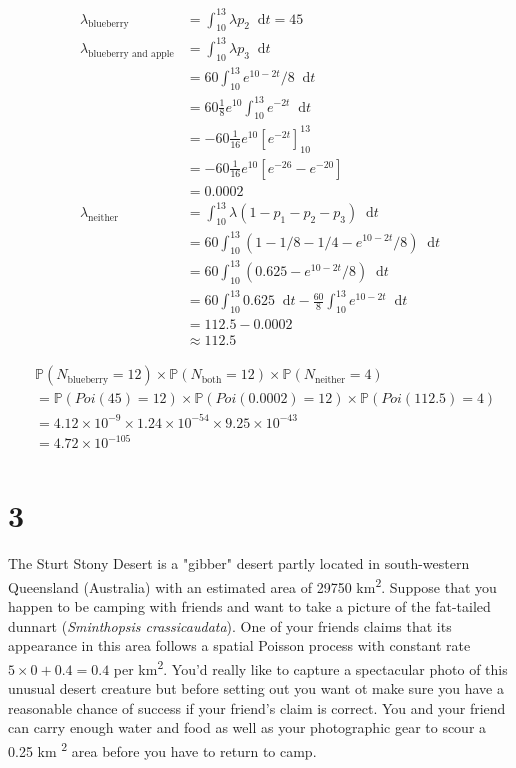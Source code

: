 \documentclass{article}
\newcommand{\diff}{\mathop{}\!\mathrm{d}}
\newcommand{\prob}{\mathbb{P}}
\begin{document}
\begin{align*}
    \lambda_{\text{blueberry}} &= \int_{10}^{13} \lambda p_2 \diff t = 45 \\
    \lambda_{\text{blueberry and apple}} &= \int_{10}^{13} \lambda p_3 \diff t \\
    &= 60 \int_{10}^{13} e^{10 - 2t}/8 \diff t \\
    &= 60 \frac{1}{8}e^{10} \int_{10}^{13} e^{-2t} \diff t \\
    &= -60 \frac{1}{16}e^{10} \left[e^{-2t}\right]_{10}^{13} \\
    &= -60 \frac{1}{16}e^{10} \left[e^{-26} - e^{-20}\right] \\
    &= 0.0002 \\
    \lambda_{\text{neither}}
    &= \int_{10}^{13} \lambda (1 - p_1 - p_2 - p_3) \diff t \\
    &= 60 \int_{10}^{13} (1 - 1/8 - 1/4 - e^{10 - 2t}/8) \diff t \\
    &= 60 \int_{10}^{13} (0.625 - e^{10 - 2t}/8) \diff t \\
    &= 60 \int_{10}^{13} 0.625 \diff t
    - \frac{60}{8} \int_{10}^{13} e^{10 - 2t} \diff t \\
    &= 112.5 - 0.0002 \\
    &\approx 112.5
\end{align*}

\begin{align*}
    &\prob(N_{\text{blueberry}} = 12) \times \prob(N_{\text{both}} = 12)
    \times \prob(N_{\text{neither}} = 4) \\
    &= \prob(Poi(45) = 12) \times \prob(Poi(0.0002) = 12)
    \times \prob(Poi(112.5) = 4) \\
    &= 4.12 \times 10^{-9} \times 1.24 \times 10^{-54}
    \times 9.25 \times 10^{-43} \\
    &= 4.72 \times 10^{-105} \\
\end{align*}

\section{3}
The Sturt Stony Desert is a "gibber" desert partly located in south-western
Queensland (Australia) with an estimated area of 29750 km\textsuperscript{2}.
Suppose that you happen to be camping with friends and want to take a picture of
the fat-tailed dunnart (\textit{Sminthopsis crassicaudata}). One of your friends
claims that its appearance in this area follows a spatial Poisson process with
constant rate $5 \times 0 + 0.4 = 0.4$ per km\textsuperscript{2}.
You'd really like to capture a spectacular photo of this unusual desert
creature but before setting out you want ot make sure you have a reasonable
chance of success if your friend's claim is correct. You and your friend can
carry enough water and food as well as your photographic gear to scour a 0.25 km
\textsuperscript{2} area before you have to return to camp.
\end{document}
